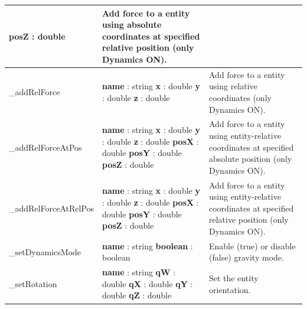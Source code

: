 \documentclass[notitlepage]{report}
\begin{document}
\begin{supertabular}{|p{2.9cm}|p{4.5cm}|p{7cm}|}
  		\textbf{posZ} : double
  		& Add force to a entity using absolute coordinates at specified relative position (only Dynamics ON).\\
  	\hline
  	\_addRelForce & 
  		\textbf{name} : string \newline
  		\textbf{x} : double \newline
  		\textbf{y} : double \newline
  		\textbf{z} : double
  		& Add force to a entity using relative coordinates (only Dynamics ON).\\
  	\hline
  	\_addRelForceAtPos & 
  		\textbf{name} : string \newline
  		\textbf{x} : double \newline
  		\textbf{y} : double \newline
  		\textbf{z} : double \newline
  		\textbf{posX} : double \newline
  		\textbf{posY} : double \newline
  		\textbf{posZ} : double
  		& Add force to a entity using entity-relative coordinates at specified absolute position (only Dynamics ON).\\
  	\hline
  	\_addRelForceAtRelPos & 
  		\textbf{name} : string \newline
  		\textbf{x} : double \newline
  		\textbf{y} : double \newline
  		\textbf{z} : double \newline
  		\textbf{posX} : double \newline
  		\textbf{posY} : double \newline
  		\textbf{posZ} : double
  		& Add force to a entity using entity-relative coordinates at specified relative position (only Dynamics ON).\\
  	\hline
  	\_setDynamicsMode & 
  		\textbf{name} : string \newline
  		\textbf{boolean} : boolean
  		& Enable (true) or disable (false) gravity mode.\\
  	\hline
  	\_setRotation & 
  		\textbf{name} : string \newline
  		\textbf{qW} : double \newline
  		\textbf{qX} : double \newline
  		\textbf{qY} : double \newline
  		\textbf{qZ} : double
  		& Set the entity orientation.\\
  	\hline
\end{supertabular}
\end{document}
